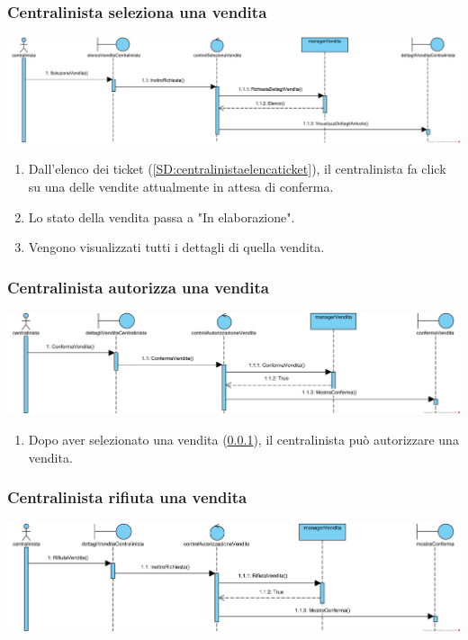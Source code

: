\documentclass[12pt,a4paper]{article}
\begin{document}
\subsubsection{Centralinista seleziona una vendita}
\label{SD:selezionevenditacentralinista}

\begin{center}
\includegraphics[width=\textwidth]{SequenceDiagram/CentralinistaVenditaSeleziona}
\end{center}

\begin{enumerate}
\item Dall'elenco dei ticket (\ref{SD:centralinistaelencaticket}), il centralinista fa click su una delle vendite attualmente in attesa di conferma.
\item Lo stato della vendita passa a "In elaborazione".
\item Vengono visualizzati tutti i dettagli di quella vendita.
\end{enumerate}

\subsubsection{Centralinista autorizza una vendita}
\label{SD:centralinistaautorizza}
\begin{center}
\includegraphics[width=\textwidth]{SequenceDiagram/CentralinistaVenditaAutorizza}
\end{center}

\begin{enumerate}
\item Dopo aver selezionato una vendita (\ref{SD:selezionevenditacentralinista}), il centralinista può autorizzare una vendita.
\end{enumerate}

\subsubsection{Centralinista rifiuta una vendita}
\label{SD:centralinistarifiuta}
\begin{center}
\includegraphics[width=\textwidth]{SequenceDiagram/CentralinistaVenditaRifiuta}
\end{center}
\end{document}
